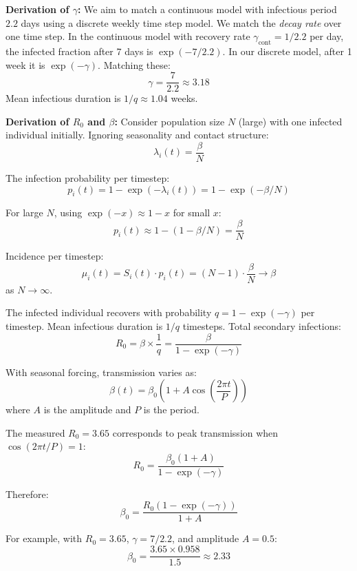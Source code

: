 \textbf{Derivation of $\gamma$:} We aim to match a continuous model
with infectious period $2.2$ days using a discrete weekly time step
model. We match the \emph{decay rate} over one time step. In the continuous
model with recovery rate $\gamma_{\text{cont}} = 1/2.2$ per day, the
infected fraction after 7 days is $\exp(-7/2.2)$. In our discrete
model, after 1 week it is $\exp(-\gamma)$. Matching these:
$$
\gamma = \frac{7}{2.2} \approx 3.18
$$
Mean infectious duration is $1/q \approx 1.04$ weeks.

\textbf{Derivation of $R_0$ and $\beta$:} Consider population size $N$ (large) with one infected individual initially. Ignoring seasonality and contact structure:
$$\lambda_i(t) = \frac{\beta}{N}$$

The infection probability per timestep:
$$p_i(t) = 1 - \exp(-\lambda_i(t)) = 1 - \exp(-\beta/N)$$

For large $N$, using $\exp(-x) \approx 1-x$ for small $x$:
$$p_i(t) \approx 1 - (1 - \beta/N) = \frac{\beta}{N}$$

Incidence per timestep:
$$\mu_i(t) = S_i(t) \cdot p_i(t) = (N-1) \cdot \frac{\beta}{N} \to \beta$$
as $N \to \infty$.

The infected individual recovers with probability $q = 1-\exp(-\gamma)$ per timestep. Mean infectious duration is $1/q$ timesteps. Total secondary infections:
$$R_0 = \beta \times \frac{1}{q} = \frac{\beta}{1-\exp(-\gamma)}$$

With seasonal forcing, transmission varies as:
$$\beta(t) = \beta_0\left(1 + A\cos\left(\frac{2\pi t}{P}\right)\right)$$
where $A$ is the amplitude and $P$ is the period.

The measured $R_0 = 3.65$ corresponds to peak transmission when $\cos(2\pi t/P) = 1$:
$$R_0 = \frac{\beta_0(1 + A)}{1-\exp(-\gamma)}$$

Therefore:
$$\beta_0 = \frac{R_0 \left(1 - \exp(-\gamma)\right)}{1 + A}$$

For example, with $R_0 = 3.65$, $\gamma = 7/2.2$, and amplitude $A = 0.5$:
$$\beta_0 = \frac{3.65 \times 0.958}{1.5} \approx 2.33$$






